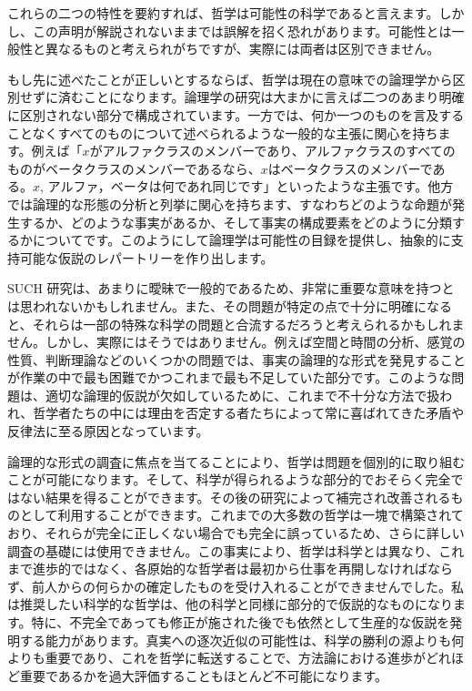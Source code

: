 \documentclass[a4paper,11pt,openany]{ltjsbook}
\begin{document}
これらの二つの特性を要約すれば、哲学は可能性の科学であると言えます。しかし、この声明が解説されないままでは誤解を招く恐れがあります。可能性とは一般性と異なるものと考えられがちですが、実際には両者は区別できません。

もし先に述べたことが正しいとするならば、哲学は現在の意味での論理学から区別せずに済むことになります。論理学の研究は大まかに言えば二つのあまり明確に区別されない部分で構成されています。一方では、何か一つのものを言及することなくすべてのものについて述べられるような一般的な主張に関心を持ちます。例えば「$x$がアルファクラスのメンバーであり、アルファクラスのすべてのものがベータクラスのメンバーであるなら、$x$はベータクラスのメンバーである。$x$, アルファ，ベータは何であれ同じです」といったような主張です。他方では論理的な形態の分析と列挙に関心を持ちます、すなわちどのような命題が発生するか、どのような事実があるか、そして事実の構成要素をどのように分類するかについてです。このようにして論理学は可能性の目録を提供し、抽象的に支持可能な仮説のレパートリーを作り出します。

SUCH 研究は、あまりに曖昧で一般的であるため、非常に重要な意味を持つとは思われないかもしれません。また、その問題が特定の点で十分に明確になると、それらは一部の特殊な科学の問題と合流するだろうと考えられるかもしれません。しかし、実際にはそうではありません。例えば空間と時間の分析、感覚の性質、判断理論などのいくつかの問題では、事実の論理的な形式を発見することが作業の中で最も困難でかつこれまで最も不足していた部分です。このような問題は、適切な論理的仮説が欠如しているために、これまで不十分な方法で扱われ、哲学者たちの中には理由を否定する者たちによって常に喜ばれてきた矛盾や反律法に至る原因となっています。

論理的な形式の調査に焦点を当てることにより、哲学は問題を個別的に取り組むことが可能になります。そして、科学が得られるような部分的でおそらく完全ではない結果を得ることができます。その後の研究によって補完され改善されるものとして利用することができます。これまでの大多数の哲学は一塊で構築されており、それらが完全に正しくない場合でも完全に誤っているため、さらに詳しい調査の基礎には使用できません。この事実により、哲学は科学とは異なり、これまで進歩的ではなく、各原始的な哲学者は最初から仕事を再開しなければならず、前人からの何らかの確定したものを受け入れることができませんでした。私は推奨したい科学的な哲学は、他の科学と同様に部分的で仮説的なものになります。特に、不完全であっても修正が施された後でも依然として生産的な仮説を発明する能力があります。真実への逐次近似の可能性は、科学の勝利の源よりも何よりも重要であり、これを哲学に転送することで、方法論における進歩がどれほど重要であるかを過大評価することもほとんど不可能になります。
\end{document}
